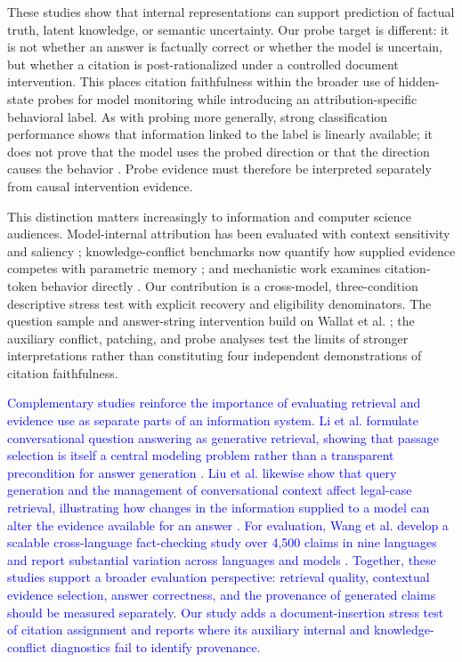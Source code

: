 \documentclass[a4paper,fleqn]{cas-sc}
\begin{document}
These studies show that internal representations can support prediction of factual truth, latent knowledge, or semantic uncertainty. Our probe target is different: it is not whether an answer is factually correct or whether the model is uncertain, but whether a citation is post-rationalized under a controlled document intervention. This places citation faithfulness within the broader use of hidden-state probes for model monitoring while introducing an attribution-specific behavioral label. As with probing more generally, strong classification performance shows that information linked to the label is linearly available; it does not prove that the model uses the probed direction or that the direction causes the behavior \cite{belinkov2022probes}. Probe evidence must therefore be interpreted separately from causal intervention evidence.

This distinction matters increasingly to information and computer science audiences. Model-internal attribution has been evaluated with context sensitivity and saliency \cite{qi2024mirage}; knowledge-conflict benchmarks now quantify how supplied evidence competes with parametric memory \cite{su2024conflictbank}; and mechanistic work examines citation-token behavior directly \cite{wallat2025correctness,vandort2026cite}. Our contribution is a cross-model, three-condition descriptive stress test with explicit recovery and eligibility denominators. The question sample and answer-string intervention build on Wallat et al. \cite{wallat2025correctness}; the auxiliary conflict, patching, and probe analyses test the limits of stronger interpretations rather than constituting four independent demonstrations of citation faithfulness.

\textcolor{blue}{Complementary studies reinforce the importance of evaluating retrieval and evidence use as separate parts of an information system. Li et al. formulate conversational question answering as generative retrieval, showing that passage selection is itself a central modeling problem rather than a transparent precondition for answer generation \cite{li2023gcoretrieval}. Liu et al. likewise show that query generation and the management of conversational context affect legal-case retrieval, illustrating how changes in the information supplied to a model can alter the evidence available for an answer \cite{liu2022legalretrieval}. For evaluation, Wang et al. develop a scalable cross-language fact-checking study over 4,500 claims in nine languages and report substantial variation across languages and models \cite{wang2026factchecking}. Together, these studies support a broader evaluation perspective: retrieval quality, contextual evidence selection, answer correctness, and the provenance of generated claims should be measured separately. Our study adds a document-insertion stress test of citation assignment and reports where its auxiliary internal and knowledge-conflict diagnostics fail to identify provenance.}
\end{document}

